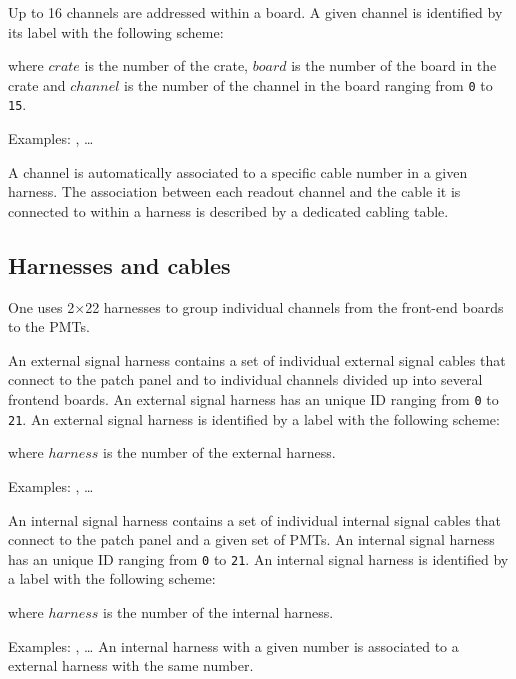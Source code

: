 \vskip 10pt  \par\noindent Up  to 16 channels  are addressed  within a
board.  A given channel is identified  by its label with the following
scheme:
\begin{center}
 \end{center}
where \texttt{$crate$} is the number of the crate, \texttt{$board$} is
the number  of the board  in the  crate and \texttt{$channel$}  is the
number  of  the  channel  in  the board  ranging  from  \texttt{0}  to
\texttt{15}.   \par\noindent Examples:  , \dots
{}

\vskip 10pt A channel is  automatically associated to a specific cable
number  in  a given  harness.  The  association between  each  readout
channel and the cable it is connected to within a harness is described
by a dedicated cabling table.

\subsection{Harnesses and cables}

One uses 2$\times$22  harnesses to group individual  channels from the
front-end boards to the PMTs.

\vskip 10pt  An external signal  harness contains a set  of individual
external  signal  cables  that  connect  to the  patch  panel  and  to
individual  channels  divided up  into  several  frontend boards.   An
external signal  harness has an  unique ID ranging from  \texttt{0} to
\texttt{21}.  An external signal harness is identified by a label with
the following scheme:
\begin{center}
 \end{center}
where \texttt{$harness$} is the number of the external harness.
\par\noindent Examples: , \dots
{}

\vskip 10pt  An internal signal  harness contains a set  of individual
internal signal cables that connect to the patch panel and a given set
of PMTs.  An internal  signal harness  has an  unique ID  ranging from
\texttt{0} to  \texttt{21}.  An internal signal  harness is identified
by a label with the following scheme:
\begin{center}
 \end{center}
where \texttt{$harness$} is the number of the internal harness.
\par\noindent Examples: , \dots
{}
\vskip 10pt An internal harness with a given number is associated to a
external harness  with the  same number.


